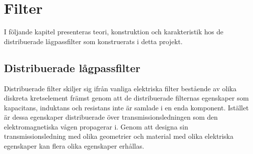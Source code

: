 \documentclass[main.tex]{subfiles}
\begin{document}
\chapter{Filter}
\label{ch:filter}
I följande kapitel presenteras teori, konstruktion och karakteristik hos de distribuerade lågpassfilter som konstruerats i detta projekt.



\section{Distribuerade lågpassfilter}
Distribuerade filter skiljer sig ifrån vanliga elektriska filter bestående av olika diskreta kretselement främst genom att de distribuerade filternas egenskaper som kapacitans, induktans och resistans inte är samlade i en enda komponent. Istället är dessa egenskaper distribuerade över transmissionsledningen som den elektromagnetiska vågen propagerar i. Genom att designa sin transmissionsledning med olika geometrier och material med olika elektriska egenskaper kan flera olika egenskaper erhållas\cite{cheng}. 
\end{document}
